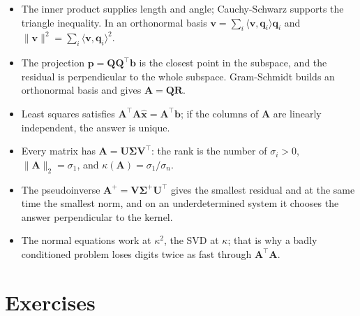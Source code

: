 \begin{ringkasan}
\begin{itemize}
  \item The inner product supplies length and angle; Cauchy-Schwarz supports the triangle
        inequality. In an orthonormal basis
        $\mathbf{v}=\sum_{i}\langle\mathbf{v},\mathbf{q}_{i}\rangle\mathbf{q}_{i}$ and
        $\|\mathbf{v}\|^{2}=\sum_{i}\langle\mathbf{v},\mathbf{q}_{i}\rangle^{2}$.
  \item The projection $\mathbf{p}=\mathbf{Q}\mathbf{Q}^{\top}\mathbf{b}$ is the closest point
        in the subspace, and the residual is perpendicular to the whole subspace. Gram-Schmidt builds an
        orthonormal basis and gives $\mathbf{A}=\mathbf{Q}\mathbf{R}$.
  \item Least squares satisfies $\mathbf{A}^{\top}\mathbf{A}\hat{\mathbf{x}}
        =\mathbf{A}^{\top}\mathbf{b}$; if the columns of $\mathbf{A}$ are linearly independent, the answer is unique.
  \item Every matrix has $\mathbf{A}=\mathbf{U}\boldsymbol{\Sigma}\mathbf{V}^{\top}$:
        the rank is the number of $\sigma_{i}>0$, $\|\mathbf{A}\|_{2}=\sigma_{1}$, and
        $\kappa(\mathbf{A})=\sigma_{1}/\sigma_{n}$.
  \item The pseudoinverse $\mathbf{A}^{+}=\mathbf{V}\boldsymbol{\Sigma}^{+}\mathbf{U}^{\top}$
        gives the smallest residual and at the same time the smallest norm, and on an underdetermined system
        it chooses the answer perpendicular to the kernel.
  \item The normal equations work at $\kappa^{2}$, the SVD at $\kappa$; that is why a badly
        conditioned problem loses digits twice as fast through $\mathbf{A}^{\top}\mathbf{A}$.
\end{itemize}
\end{ringkasan}

\section{Exercises}

